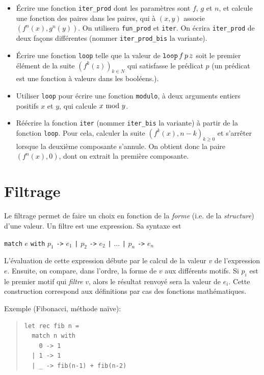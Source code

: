 \documentclass[11pt, a4paper]{article}
\begin{document}
\begin{itemize}
  \item Écrire une fonction \verb+iter_prod+ dont les paramètres
  sont $f$, $g$ et $n$, et calcule une fonction des paires dans les
  paires, qui à $(x, y)$ associe $(f^n(x), g^n(y))$. On utilisera
  \verb+fun_prod+ et \verb+iter+. On écrira \texttt{iter\_prod} de
  deux façons différentes (nommer \verb|iter_prod_bis| la variante).

  \item Écrire une fonction \verb+loop+ telle que la valeur de
  $\mbox{\tt loop} \, f \, p \, z$ soit le premier élément de la suite
  $(f^k(z))_{k\in N}$ qui satisfasse le prédicat $p$ (un prédicat est
  une fonction à valeurs dans les booléens.).

  \item Utiliser {\tt loop} pour écrire une fonction {\tt modulo}, à
  deux arguments entiers positifs $x$ et $y$, qui calcule $x \mbox{\rm
  \ mod\ } y$.

  \item Réécrire la fonction \verb+iter+ (nommer \verb|iter_bis| la
  variante) à partir de la fonction \verb+loop+. Pour cela, calculer
  la suite $(f^k(x), n-k)_{k \geq 0}$ et s'arrêter lorsque la deuxième
  composante s'annule. On obtient donc la paire $(f^n(x), 0)$, dont on
  extrait la première composante.

\end{itemize}

\section{Filtrage}

Le filtrage permet de faire un choix en fonction de la {\em forme}
(i.e. de la {\em structure}) d'une valeur.  Un filtre est une
expression. Sa syntaxe est
\begin{center}
\verb+match+ $e$ \verb+with+
    $p_1$ \verb+->+ $e_1$
\verb+|+ $p_2$ \verb+->+ $e_2$ \verb+|+
    $\ldots$
\verb+|+ $p_n$ \verb+->+ $e_n$
\end{center}
L'évaluation de cette expression débute par le calcul de la valeur $v$
de l'expression $e$. Ensuite, on compare, dans l'ordre, la forme de
$v$ aux différents motifs. Si $p_i$ est le premier motif qui {\em
filtre} $v$, alors le résultat renvoyé sera la valeur de $e_i$. Cette
construction correspond aux définitions par cas des fonctions
mathématiques.

\noindent Exemple (Fibonacci, méthode naïve):
\begin{quote}
\begin{verbatim}
let rec fib n =
  match n with
    0 -> 1
  | 1 -> 1
  | _ -> fib(n-1) + fib(n-2)
\end{verbatim}
\end{quote}
\end{document}
